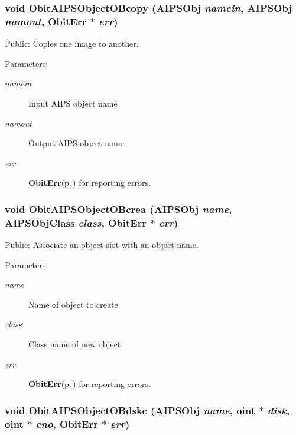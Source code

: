 \subsubsection{\setlength{\rightskip}{0pt plus 5cm}void Obit\-AIPSObject\-OBcopy ({\bf AIPSObj} {\em namein}, {\bf AIPSObj} {\em namout}, {\bf Obit\-Err} $\ast$ {\em err})}\label{ObitAIPSObject_8c_a36}


Public: Copies one image to another. 

\begin{Desc}
\item[Parameters:]
\begin{description}
\item[{\em namein}]Input AIPS object name \item[{\em namout}]Output AIPS object name \item[{\em err}]{\bf Obit\-Err}{\rm (p.\,\pageref{structObitErr})} for reporting errors. \end{description}
\end{Desc}
\subsubsection{\setlength{\rightskip}{0pt plus 5cm}void Obit\-AIPSObject\-OBcrea ({\bf AIPSObj} {\em name}, {\bf AIPSObj\-Class} {\em class}, {\bf Obit\-Err} $\ast$ {\em err})}\label{ObitAIPSObject_8c_a27}


Public: Associate an object slot with an object name. 

\begin{Desc}
\item[Parameters:]
\begin{description}
\item[{\em name}]Name of object to create \item[{\em class}]Class name of new object \item[{\em err}]{\bf Obit\-Err}{\rm (p.\,\pageref{structObitErr})} for reporting errors. \end{description}
\end{Desc}
\subsubsection{\setlength{\rightskip}{0pt plus 5cm}void Obit\-AIPSObject\-OBdskc ({\bf AIPSObj} {\em name}, {\bf oint} $\ast$ {\em disk}, {\bf oint} $\ast$ {\em cno}, {\bf Obit\-Err} $\ast$ {\em err})}\label{ObitAIPSObject_8c_a33}


